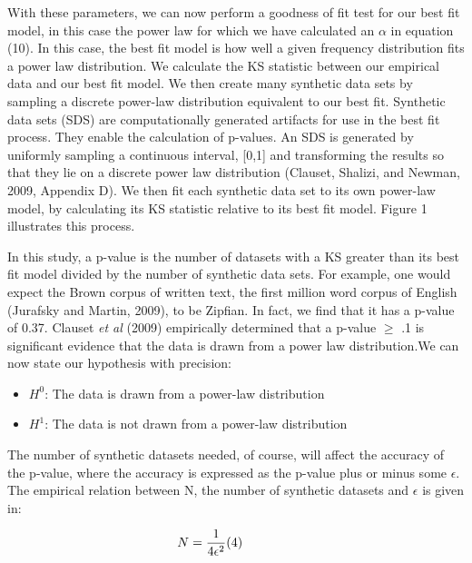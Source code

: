 \documentclass[12pt]{article}
\begin{document}
With these parameters, we can now perform a goodness of fit test for our best fit model, in this case the power law for which we have calculated an $\alpha$ in equation (10). In this case, the best fit model is how well a given frequency distribution fits a power law distribution. We calculate the KS statistic between our empirical data and our best fit model.  We then create many synthetic data sets by sampling a discrete power-law distribution equivalent to our best fit. Synthetic data sets (SDS) are computationally generated artifacts for use in the best fit process.  They enable the calculation of p-values.  An SDS is generated by uniformly sampling a continuous interval, [0,1]  and transforming the results so that they lie on a discrete power law distribution (Clauset, Shalizi, and Newman, 2009, Appendix D).  We then fit each synthetic data set to its own power-law model, by calculating its KS statistic relative to its best fit model. Figure 1 illustrates this process.  

In this study, a p-value is the number of datasets with a KS greater than its best fit model divided by the number of synthetic data sets.   For example, one would expect the Brown corpus of written text, the first million word corpus of English (Jurafsky and Martin, 2009), to be Zipfian.  In fact, we find that it has a p-value of 0.37.  Clauset \emph{et al} (2009) empirically determined that a p-value $\geq$ .1 is significant evidence that the data is drawn from a power law distribution.We can now state our hypothesis with precision:

\begin{itemize}
\item $H^0$: The data is drawn from a power-law distribution
\item $H^1$: The data is not drawn from a power-law distribution
\end{itemize}

The number of synthetic datasets needed, of course, will affect the accuracy of the p-value, where the accuracy is expressed as the p-value plus or minus some $\epsilon$. The empirical relation between N, the number of synthetic datasets and  $\epsilon$ is given in: 

\begin{equation*}
\begin{aligned}
N = \frac{1}{4{\epsilon}^2}\hspace{4em (4)}
\end{aligned}
\end{equation*}
\end{document}
